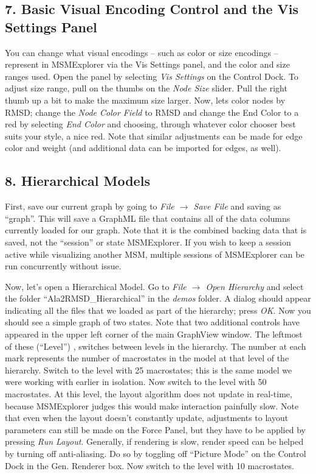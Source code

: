 \documentclass[10pt,a4paper]{report}
\begin{document}
\subsection*{7. Basic Visual Encoding Control and the Vis Settings Panel}
You can change what visual encodings -- such as color or size encodings -- represent in MSMExplorer via the Vis Settings panel, and the color and size ranges used. Open the panel by selecting \emph{Vis Settings} on the Control Dock. To adjust size range, pull on the thumbs on the \emph{Node Size} slider. Pull the right thumb up a bit to make the maximum size larger. Now, lets color nodes by RMSD; change the \emph{Node Color Field} to RMSD and change the End Color to a red by selecting \emph{End Color} and choosing, through whatever color chooser best suits your style, a nice red. Note that similar adjustments can be made for edge color and weight (and additional data can be imported for edges, as well).

\subsection*{8. Hierarchical Models}
First, save our current graph by going to \emph{File $\rightarrow$ Save File} and saving as ``graph''. This will save a GraphML file that contains all of the data columns currently loaded for our graph. Note that it is the combined backing data that is saved, not the ``session'' or state MSMExplorer. If you wish to keep a session active while visualizing another MSM, multiple sessions of MSMExplorer can be run concurrently without issue. 

Now, let's open a Hierarchical Model. Go to \emph{File $\rightarrow$ Open Hierarchy} and select the folder ``Ala2RMSD\_Hierarchical'' in the \emph{demos} folder. A dialog should appear indicating all the files that we loaded as part of the hierarchy; press \emph{OK}. Now you should see a simple graph of two states. Note that two additional controls have appeared in the upper left corner of the main GraphView window. The leftmost of these (``Level'') , switches between levels in the hierarchy. The number at each mark represents the number of macrostates in the model at that level of the hierarchy. Switch to the level with 25 macrostates; this is the same model we were working with earlier in isolation. Now switch to the level with 50 macrostates. At this level, the layout algorithm does not update in real-time, because MSMExplorer judges this would make interaction painfully slow. Note that even when the layout doesn't constantly update, adjustments to layout parameters can still be made on the Force Panel, but they have to be applied by pressing \emph{Run Layout}. Generally, if rendering is slow, render speed can be helped by turning off anti-aliasing. Do so by toggling off ``Picture Mode'' on the Control Dock in the Gen. Renderer box. Now switch to the level with 10 macrostates. 
\end{document}
